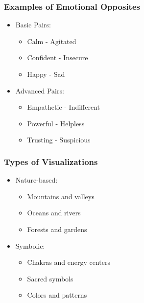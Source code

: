 \begin{frame}[fragile]\frametitle{Examples of Emotional Opposites}
    \begin{itemize}
        \item Basic Pairs:
            \begin{itemize}
                \item Calm - Agitated
                \item Confident - Insecure
                \item Happy - Sad
            \end{itemize}
        \item Advanced Pairs:
            \begin{itemize}
                \item Empathetic - Indifferent
                \item Powerful - Helpless
                \item Trusting - Suspicious
            \end{itemize}
    \end{itemize}
\end{frame}

\begin{frame}[fragile]\frametitle{Types of Visualizations}
    \begin{itemize}
        \item Nature-based:
            \begin{itemize}
                \item Mountains and valleys
                \item Oceans and rivers
                \item Forests and gardens
            \end{itemize}
        \item Symbolic:
            \begin{itemize}
                \item Chakras and energy centers
                \item Sacred symbols
                \item Colors and patterns
            \end{itemize}
    \end{itemize}
\end{frame}

